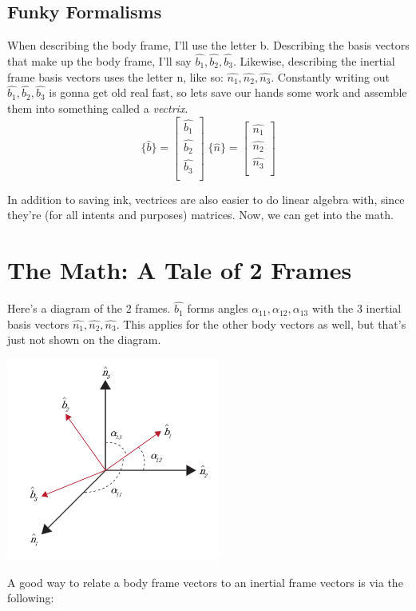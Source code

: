 \documentclass[a4paper,14pt]{extreport}
\newcommand{\bv}[1]{\hat{b_{#1}}}
\newcommand{\nv}[1]{\hat{n_{#1}}}
\begin{document}
\subsection{Funky Formalisms}
When describing the body frame, I'll use the letter b. Describing the basis vectors that make up the body frame, I'll say $\bv{1}, \bv{2}, \bv{3}$. Likewise, describing the inertial frame basis vectors uses the letter n, like so: $\nv{1}, \nv{2}, \nv{3}$. Constantly writing out $\bv{1}, \bv{2}, \bv{3}$ is gonna get old real fast, so lets save our hands some work and assemble them into something called a \emph{vectrix}.
\[
\{\hat{b}\} = 
\begin{bmatrix}
\bv{1}\\ \bv{2}\\ \bv{3}\\
\end{bmatrix}\;
\{\hat{n}\} = 
\begin{bmatrix}
\nv{1}\\ \nv{2}\\ \nv{3}\\
\end{bmatrix}
\] 

In addition to saving ink, vectrices are also easier to do linear algebra with, since they're (for all intents and purposes) matrices. Now, we can get into the math.
\section{The Math: A Tale of 2 Frames}
Here's a diagram of the 2 frames. $\bv{1}$ forms angles $\alpha_{11}, \alpha_{12}, \alpha_{13}$ with the 3 inertial basis vectors $\nv{1},\nv{2},\nv{3}$. This applies for the other body vectors as well, but that's just not shown on the diagram.
\begin{center}
\includegraphics[width=7cm]{dcmalpha}
\end{center}
A good way to relate a body frame vectors to an inertial frame vectors is via the following:
\end{document}
